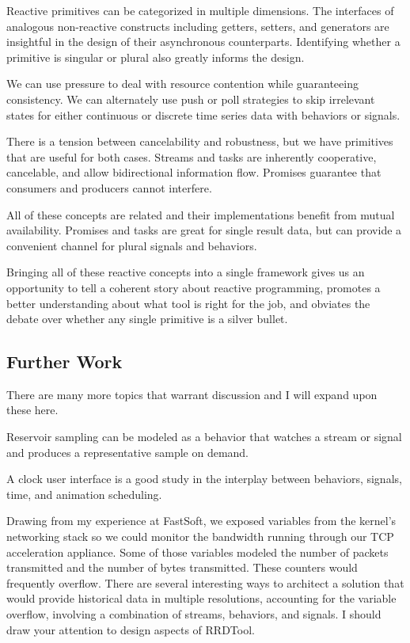 Reactive primitives can be categorized in multiple dimensions. The interfaces of analogous non-reactive constructs including getters, setters, and generators are insightful in the design of their asynchronous counterparts. Identifying whether a primitive is singular or plural also greatly informs the design.

We can use pressure to deal with resource contention while guaranteeing consistency. We can alternately use push or poll strategies to skip irrelevant states for either continuous or discrete time series data with behaviors or signals.

There is a tension between cancelability and robustness, but we have primitives that are useful for both cases. Streams and tasks are inherently cooperative, cancelable, and allow bidirectional information flow. Promises guarantee that consumers and producers cannot interfere.

All of these concepts are related and their implementations benefit from mutual availability. Promises and tasks are great for single result data, but can provide a convenient channel for plural signals and behaviors.

Bringing all of these reactive concepts into a single framework gives us an opportunity to tell a coherent story about reactive programming, promotes a better understanding about what tool is right for the job, and obviates the debate over whether any single primitive is a silver bullet.

\subsection{Further Work}

There are many more topics that warrant discussion and I will expand upon these here.

Reservoir sampling can be modeled as a behavior that watches a stream or signal and produces a representative sample on demand.

A clock user interface is a good study in the interplay between behaviors, signals, time, and animation scheduling.

Drawing from my experience at FastSoft, we exposed variables from the kernel's networking stack so we could monitor the bandwidth running through our TCP acceleration appliance. Some of those variables modeled the number of packets transmitted and the number of bytes transmitted. These counters would frequently overflow. There are several interesting ways to architect a solution that would provide historical data in multiple resolutions, accounting for the variable overflow, involving a combination of streams, behaviors, and signals. I should draw your attention to design aspects of RRDTool.

